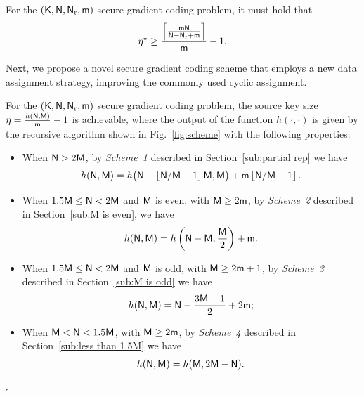 \documentclass[conference,letterpaper]{IEEEtran}
\begin{document}
\begin{cor}
\label{cor:converse cor}
For the $({\sf K},{\sf N},{\sf N}_{\rm r}, {\sf m})$ secure gradient coding problem,
 it must hold that
\begin{align}
\eta^{\star} \geq \frac{\left\lceil  \frac{{\sf m}{\sf N}}{{\sf N}-{\sf N}_{\rm r}+{\sf m}} \right\rceil}{{\sf m}} -1. \label{eq:converse cor}
\end{align}
\end{cor} 
      


Next, we propose a novel secure gradient coding scheme that employs a new data assignment strategy, improving the commonly used cyclic  assignment.

\begin{thm}
\label{thm:main achievable scheme}
For the $({\sf K},{\sf N},{\sf N}_{\rm r}, {\sf m})$ secure gradient coding problem, the source key size  $\eta=  \frac{ h({\sf N},{\sf M})}{{\sf m}}-1$ is achievable, where the output of the function \( h(\cdot, \cdot) \) is given by the recursive algorithm shown in Fig.~\ref{fig:scheme} with the following properties:
 \begin{itemize}

 \item When  ${\sf N} > 2{\sf M}$,  by {\it Scheme~1} described in Section~\ref{sub:partial rep} we have  
\begin{align}
h({\sf N},{\sf M})=h\big({\sf N}-\left\lfloor {\sf N}/{\sf M}-1\right\rfloor {\sf M},{\sf M}\big)+ {\sf m}\left\lfloor {\sf N}/{\sf M} -1\right\rfloor  . \label{eq:from partial rep}
\end{align} 
\item When $1.5 {\sf M} \leq {\sf N} < 2 {\sf M}$ and ${\sf M}$ is even, with ${\sf M} \geq 2{\sf m}$,
by {\it Scheme~2} described in Section~\ref{sub:M is even}, we have  
\begin{align}
 h({\sf N}, {\sf M}) = h\left({\sf N} - {\sf M}, \frac{{\sf M}}{2}\right) + {\sf m}. \label{eq:M is even}
\end{align}

 \item When $1.5 {\sf M} \leq  {\sf N} < 2 {\sf M}$ and ${\sf M}$ is odd, with ${\sf M} \geq 2{\sf m}+1$, by  {\it Scheme~3} described in Section~\ref{sub:M is odd} we have  
 \begin{align}
 h({\sf N},{\sf M})=   {\sf N}-\frac{3{\sf M}-1}{2}+2 {\sf m}; \label{eq:M is odd}
 \end{align}
 \item When ${\sf M}< {\sf N} <  1.5 {\sf M}$, with ${\sf M} \geq 2{\sf m}$, by  {\it Scheme~4} described in Section~\ref{sub:less than 1.5M}  we have  
\begin{align}
h({\sf N},{\sf M})=h({\sf M},2{\sf M}-{\sf N}). \label{eq:less than 1.5M}
\end{align} 
  \end{itemize}
    \hfill $\square$ 
 \end{thm} 
\end{document}
